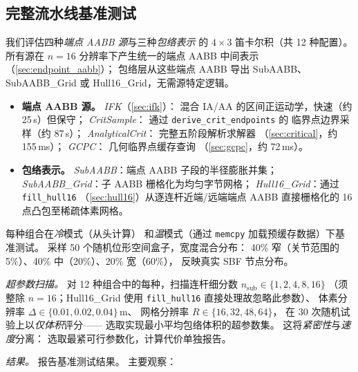 \documentclass[journal]{IEEEtran}
\begin{document}
\subsection{完整流水线基准测试}\label{sec:exp_pipeline}

我们评估四种\emph{端点 AABB 源}与三种\emph{包络表示}
的 $4{\times}3$ 笛卡尔积（共 12 种配置）。
所有源在 $n{=}16$ 分辨率下产生统一的端点 AABB 中间表示
（\cref{sec:endpoint_aabb}）；
包络层从这些端点 AABB 导出 SubAABB、SubAABB\_Grid
或 Hull16\_Grid，无需源特定逻辑。

\begin{itemize}
  \item \textbf{端点 AABB 源。}
    \emph{IFK}（\cref{sec:ifk}）：
    混合 IA/AA 的区间正运动学，快速（约 25\,\textmu s）但保守；
    \emph{CritSample}：
    通过 \texttt{derive\_crit\_endpoints} 的
    临界点边界采样（约 87\,\textmu s）；
    \emph{AnalyticalCrit}：
    完整五阶段解析求解器
    （\cref{sec:critical}，约 155\,ms）；
    \emph{GCPC}：
    几何临界点缓存查询
    （\cref{sec:gcpc}，约 72\,ms）。
  \item \textbf{包络表示。}
    \emph{SubAABB}：端点 AABB 子段的半径膨胀并集；
    \emph{SubAABB\_Grid}：子 AABB 栅格化为均匀字节网格；
    \emph{Hull16\_Grid}：通过 \texttt{fill\_hull16}
    （\cref{sec:hull16}）从逐连杆近端/远端端点 AABB
    直接栅格化的 16 点凸包至稀疏体素网格。
\end{itemize}
每种组合在\emph{冷}模式（从头计算）
和\emph{温}模式（通过 \texttt{memcpy} 加载预缓存数据）下基准测试。
采样 50 个随机位形空间盒子，宽度混合分布：
40\% 窄（关节范围的 5\%）、40\% 中（20\%）、20\% 宽（60\%），
反映真实 SBF 节点分布。

\emph{超参数扫描。}
对 12 种组合中的每种，扫描连杆细分数
$n_\text{sub} \in \{1,2,4,8,16\}$
（须整除 $n{=}16$；Hull16\_Grid 使用 \texttt{fill\_hull16}
直接处理故忽略此参数）、
体素分辨率 $\Delta \in \{0.01, 0.02, 0.04\}$\,m、
网格分辨率 $R \in \{16,32,48,64\}$，
在 30 次随机试验上以\emph{仅体积}评分——
选取实现最小平均包络体积的超参数集。
这将\emph{紧密性}与\emph{速度}分离：
选取最紧可行参数化，计算代价单独报告。

\emph{结果。}
报告基准测试结果。
主要观察：
\end{document}
